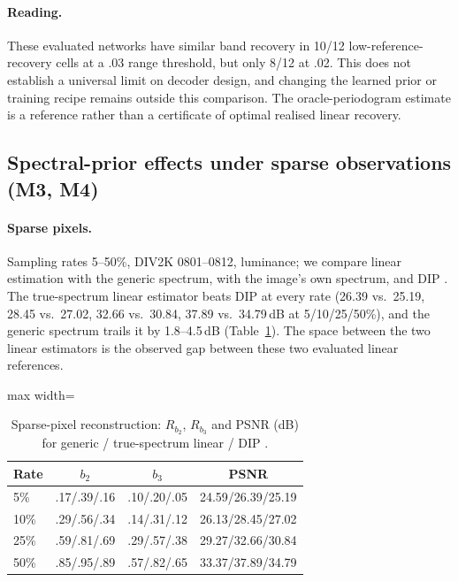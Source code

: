 \paragraph{Reading.} These evaluated networks have similar band recovery
in 10/12 low-reference-recovery cells at a .03 range threshold, but only
8/12 at .02. This does not establish a universal limit on decoder design,
and changing the learned prior or training recipe remains outside this
comparison. The oracle-periodogram estimate is a reference rather than a
certificate of optimal realised linear recovery.

\subsection{Spectral-prior effects under sparse observations (M3, M4)}\label{sec:exp-b}

\paragraph{Sparse pixels.} Sampling rates 5--50\%, DIV2K 0801--0812,
luminance; we compare linear estimation with the generic spectrum, with the
image's own spectrum, and DIP \citep{ulyanov2018dip} . The true-spectrum linear estimator beats DIP at every rate
(26.39 vs.\ 25.19, 28.45 vs.\ 27.02, 32.66 vs.\ 30.84, 37.89 vs.\ 34.79\,dB at
5/10/25/50\%), and the generic spectrum trails it by 1.8--4.5\,dB
(Table~\ref{tab:sparse}). The space between the two linear estimators is the observed gap between these two evaluated linear references.

\begin{table}[t]\centering\small
\caption{Sparse-pixel reconstruction: $R_{b_2}$, $R_{b_3}$ and PSNR (dB) for
generic / true-spectrum linear / DIP .}\label{tab:sparse}
\setlength{\tabcolsep}{3pt}
\begin{adjustbox}{max width=\linewidth}\begin{tabular}{lccc}\toprule
Rate & $b_2$ & $b_3$ & PSNR\\\midrule
5\% & .17/.39/.16 & .10/.20/.05 & 24.59/26.39/25.19\\
10\% & .29/.56/.34 & .14/.31/.12 & 26.13/28.45/27.02\\
25\% & .59/.81/.69 & .29/.57/.38 & 29.27/32.66/30.84\\
50\% & .85/.95/.89 & .57/.82/.65 & 33.37/37.89/34.79\\
\bottomrule\end{tabular}\end{adjustbox}
\end{table}

